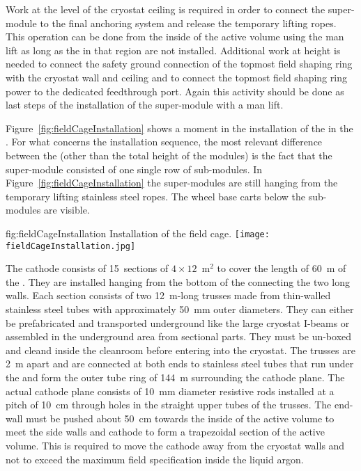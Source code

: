 Work at the level of the cryostat ceiling is required in order to connect the super-module to the final anchoring system and release the temporary lifting ropes.
This operation can be done from the inside of the active volume using the man lift as long as the  in that region are not installed.
Additional work at height is needed to connect the safety ground connection of the topmost field shaping ring with the cryostat wall and ceiling and to connect the topmost field shaping ring power to the dedicated feedthrough port.
Again this activity should be done as last steps of the installation of the super-module with a man lift.

Figure~\ref{fig:fieldCageInstallation} shows a moment in the installation of the  in the .
For what concerns the installation sequence, the most relevant difference between the  (other than the total height of the modules) is the fact that the super-module consisted of one single row of sub-modules.
In Figure~\ref{fig:fieldCageInstallation} the super-modules are still hanging from the temporary lifting stainless steel ropes.
The wheel base carts below the sub-modules are visible.
\begin{dunefigure}{fig:fieldCageInstallation}
{Installation of the  field cage.}
\texttt{[image: fieldCageInstallation.jpg]}
\end{dunefigure}

The cathode consists of 15~sections of $4 \times 12$~m$^2$ to cover the length of 60~m of the  .
They are installed hanging from the bottom of the  connecting the two long walls.
Each section consists of two 12~m-long trusses made from thin-walled stainless steel tubes with approximately 50~mm outer diameters.
They can either be prefabricated and transported underground like the large cryostat I-beams or assembled in the underground area from sectional parts.
They must be un-boxed and cleand inside the cleanroom before entering into the cryostat.
The trusses are 2~m apart and are connected at both ends to stainless steel tubes that run under the  and form the outer tube ring of 144~m surrounding the cathode plane.
The actual cathode plane consists of 10~mm diameter resistive rods installed at a pitch of 10~cm through holes in the straight upper tubes of the trusses.
The  end-wall must be pushed about 50~cm towards the inside of the active volume to meet the  side walls and cathode to form a trapezoidal section of the active volume.
This is required to move the cathode away from the cryostat walls and not to exceed the maximum field specification inside the liquid argon.


